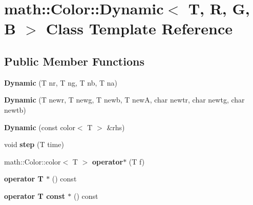 \hypertarget{classmath_1_1Color_1_1Dynamic}{\section{math\-:\-:\-Color\-:\-:\-Dynamic$<$ \-T, \-R, \-G, \-B $>$ \-Class \-Template \-Reference}
\label{classmath_1_1Color_1_1Dynamic}
}
\subsection*{\-Public \-Member \-Functions}
\begin{DoxyCompactItemize}
\item 
\hypertarget{classmath_1_1Color_1_1Dynamic_a300a309276874edf8ad8b778ea5168ce}{{\bfseries \-Dynamic} (\-T nr, \-T ng, \-T nb, \-T na)}\label{classmath_1_1Color_1_1Dynamic_a300a309276874edf8ad8b778ea5168ce}

\item 
\hypertarget{classmath_1_1Color_1_1Dynamic_a3c9f44dfe49459bda2dd81051058ea51}{{\bfseries \-Dynamic} (\-T newr, \-T newg, \-T newb, \-T new\-A, char newtr, char newtg, char newtb)}\label{classmath_1_1Color_1_1Dynamic_a3c9f44dfe49459bda2dd81051058ea51}

\item 
\hypertarget{classmath_1_1Color_1_1Dynamic_a8aa4ef281a234fde82fcd4c164e2a4ff}{{\bfseries \-Dynamic} (const color$<$ \-T $>$ \&rhs)}\label{classmath_1_1Color_1_1Dynamic_a8aa4ef281a234fde82fcd4c164e2a4ff}

\item 
\hypertarget{classmath_1_1Color_1_1Dynamic_a2ed0e1e11972d736f65f75938462fe54}{void {\bfseries step} (\-T time)}\label{classmath_1_1Color_1_1Dynamic_a2ed0e1e11972d736f65f75938462fe54}

\item 
\hypertarget{classmath_1_1Color_1_1Dynamic_a70cb1bd9e11ad6153c1f94bdfcef408b}{math\-::\-Color\-::color$<$ \-T $>$ {\bfseries operator$\ast$} (\-T f)}\label{classmath_1_1Color_1_1Dynamic_a70cb1bd9e11ad6153c1f94bdfcef408b}

\item 
\hypertarget{classmath_1_1Color_1_1Dynamic_aa77e0b563bc2e25866edbd751fb22a81}{{\bfseries operator T $\ast$} () const }\label{classmath_1_1Color_1_1Dynamic_aa77e0b563bc2e25866edbd751fb22a81}

\item 
\hypertarget{classmath_1_1Color_1_1Dynamic_a504c899f2f15b611b94da9b664e2d4c7}{{\bfseries operator T const $\ast$} () const }\label{classmath_1_1Color_1_1Dynamic_a504c899f2f15b611b94da9b664e2d4c7}

\end{DoxyCompactItemize}
